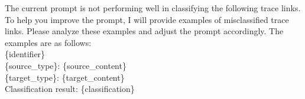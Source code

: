 The current prompt is not performing well in classifying the following trace links.
To help you improve the prompt, I will provide examples of misclassified trace links. 
Please analyze these examples and adjust the prompt accordingly. 
The examples are as follows: \\
\{identifier\}\\
\{source\_type\}: \tripplequote\{source\_content\}\tripplequote\\
\{target\_type\}: \tripplequote\{target\_content\}\tripplequote\\
Classification result: \{classification\}